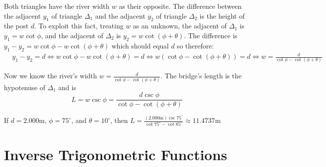 \documentclass{article}
\begin{document}
Both triangles have the river width \(w\) as their opposite. The difference between the adjacent \(y_1\) of triangle \(\Delta_1\) and the adjacent \(y_2\) of triangle \(\Delta_2\) is the height of the post \(d\). To exploit this fact, treating \(w\) as an unknown, the adjacent of \(\Delta_1\) is \(y_1 = w\cot\phi\), and the adjacent of \(\Delta_2\) is \(y_2 = w\cot(\phi + \theta)\). The difference is \(y_1 - y_2 = w\cot\phi - w\cot(\phi + \theta)\) which should equal \(d\) so therefore:
\begin{align*}
& y_1 - y_2 = d 
\iff w\cot\phi - w\cot(\phi + \theta) = d
\iff w(\cot\phi - \cot(\phi + \theta)) = d 
\iff w = \frac{d}{\cot\phi - \cot(\phi + \theta)}
\end{align*}

Now we know the river's width \(w = \frac{d}{\cot\phi - \cot(\phi + \theta)}\). The bridge's length is the hypotenuse of \(\Delta_1\) and is 
\[L = w\csc\phi = \frac{d\csc\phi}{\cot\phi - \cot(\phi + \theta)}\]

If \(d = 2.000\text{m}\), \(\phi = 75^\circ\), and \(\theta = 10^\circ\), then \(L = \frac{(2.000\text{m})\csc 75^\circ}{\cot 75^\circ - \cot 85^\circ} \approx 11.4737\text{m}\)



\section{Inverse Trigonometric Functions}
\end{document}
